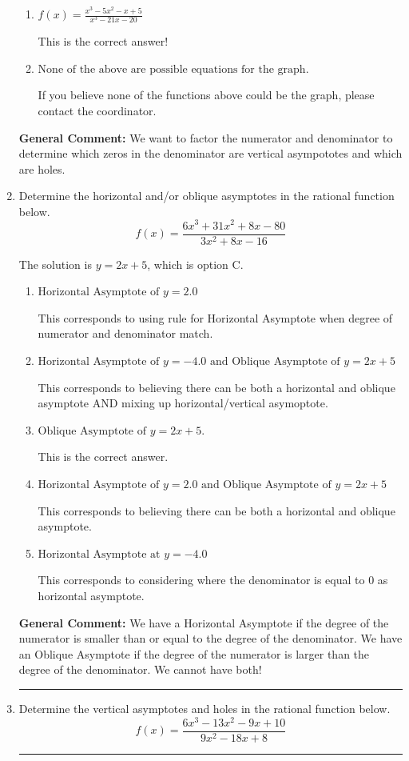 \documentclass{extbook}[14pt]
\newcommand{\litem}[1]{\item #1

\rule{\textwidth}{0.4pt}}
\begin{document}
\begin{enumerate}
{\begin{enumerate}[label=\Alph*.]
You treated all of the zeros in the denominator as vertical asmptotes when some of them were holes and wrote factors as $x+z$.
\item \( f(x)=\frac{x^{3} -5 x^{2} -x + 5}{x^{3} -21 x -20} \)

This is the correct answer!
\item \( \text{None of the above are possible equations for the graph.} \)

If you believe none of the functions above could be the graph, please contact the coordinator.
\end{enumerate}

\textbf{General Comment:} We want to factor the numerator and denominator to determine which zeros in the denominator are vertical asympototes and which are holes.
}
\litem{
Determine the horizontal and/or oblique asymptotes in the rational function below.
\[ f(x) = \frac{6x^{3} +31 x^{2} +8 x -80}{3x^{2} +8 x -16} \]

The solution is \( y = 2x + 5 \), which is option C.\begin{enumerate}[label=\Alph*.]
\item \( \text{Horizontal Asymptote of } y = 2.0  \)

This corresponds to using rule for Horizontal Asymptote when degree of numerator and denominator match.
\item \( \text{Horizontal Asymptote of } y = -4.0 \text{ and Oblique Asymptote of } y = 2x + 5 \)

This corresponds to believing there can be both a horizontal and oblique asymptote AND mixing up horizontal/vertical asymoptote.
\item \( \text{Oblique Asymptote of } y = 2x + 5. \)

This is the correct answer.
\item \( \text{Horizontal Asymptote of } y = 2.0 \text{ and Oblique Asymptote of } y = 2x + 5 \)

This corresponds to believing there can be both a horizontal and oblique asymptote.
\item \( \text{Horizontal Asymptote at } y = -4.0 \)

This corresponds to considering where the denominator is equal to 0 as horizontal asymptote.
\end{enumerate}

\textbf{General Comment:} We have a Horizontal Asymptote if the degree of the numerator is smaller than or equal to the degree of the denominator. We have an Oblique Asymptote if the degree of the numerator is larger than the degree of the denominator. We cannot have both!
}
\litem{
Determine the vertical asymptotes and holes in the rational function below.
\[ f(x) = \frac{6x^{3} -13 x^{2} -9 x + 10}{9x^{2} -18 x + 8} \]

}
\end{enumerate}
\end{document}
